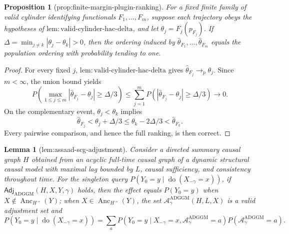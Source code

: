 \documentclass{article}
\newtheorem{lemma}{Lemma}
\newtheorem{proposition}{Proposition}
\begin{document}
\begin{proposition}[prop:finite-margin-plugin-ranking]\label{prop:finite-margin-plugin-ranking}
For a fixed finite family of valid cylinder identifying functionals \(F_1,\ldots,F_m\), suppose each trajectory obeys the hypotheses of \(\mathrm{lem:valid\text{-}cylinder\text{-}hac\text{-}delta}\), and let \(\theta_j=F_j(p_{F_j})\).  If \(\Delta=\min_{j\ne k}|\theta_j-\theta_k|>0\), then the ordering induced by \(\widehat\theta_{F_1},\ldots,\widehat\theta_{F_m}\) equals the population ordering with probability tending to one.
\end{proposition}
\begin{proof}
For every fixed \(j\), \(\mathrm{lem:valid\text{-}cylinder\text{-}hac\text{-}delta}\) gives \(\widehat\theta_{F_j}\to_p\theta_j\).  Since \(m<\infty\), the union bound yields
\[
 P\!\left(\max_{1\le j\le m}|\widehat\theta_{F_j}-\theta_j|\ge\Delta/3\right)
 \le\sum_{j=1}^mP\!\left(|\widehat\theta_{F_j}-\theta_j|\ge\Delta/3\right)
 \longrightarrow0.
\]
On the complementary event, \(\theta_j<\theta_k\) implies
\[
 \widehat\theta_{F_j}<\theta_j+\Delta/3
 \le\theta_k-2\Delta/3
 <\widehat\theta_{F_k}.
\]
Every pairwise comparison, and hence the full ranking, is then correct.
\end{proof}

\begin{lemma}[lem:assaad-scg-adjustment]\label{lem:assaad-scg-adjustment}
Consider a directed summary causal graph \(H\) obtained from an acyclic full-time causal graph of a dynamic structural causal model with maximal lag bounded by \(L\), causal sufficiency, and consistency throughout time.  For the singleton query \(P(Y_0=y\mid\operatorname{do}(X_{-\gamma}=x))\), if \(\mathsf{Adj}_{\mathrm{ADGGM}}(H,X,Y,\gamma)\) holds, then the effect equals \(P(Y_0=y)\) when \(X\notin\operatorname{Anc}_{H^{\to}}(Y)\); when \(X\in\operatorname{Anc}_{H^{\to}}(Y)\), the set \(\mathcal A_{\gamma}^{\mathrm{ADGGM}}(H,L,X)\) is a valid adjustment set and
\[
 P(Y_0=y\mid\operatorname{do}(X_{-\gamma}=x))
 =\sum_a P(Y_0=y\mid X_{-\gamma}=x,
 \mathcal A_{\gamma}^{\mathrm{ADGGM}}=a)
 P(\mathcal A_{\gamma}^{\mathrm{ADGGM}}=a).
\]
\end{lemma}
\end{document}
